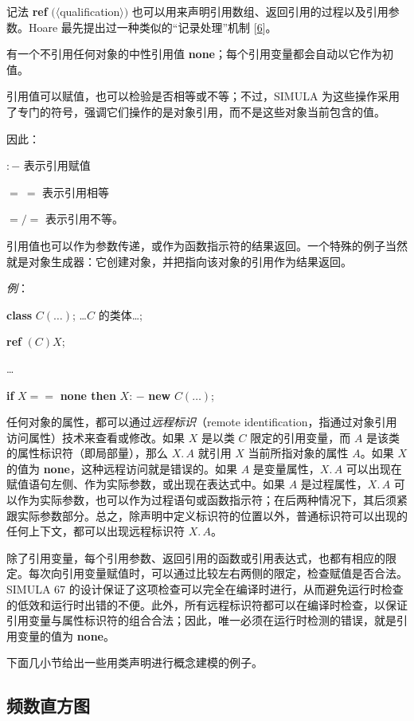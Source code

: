 \documentclass[twoside,11pt,fontset=none]{ctexbook}
\begin{document}
\noindent
记法 \textbf{ref} $(\langle$qualification$\rangle)$ 也可以用来声明引用数组、返回引用的过程以及引用参数。Hoare 最先提出过一种类似的“记录处理”机制 [\hyperref[ref:6]{6}]。

有一个不引用任何对象的中性引用值 \textbf{none}；每个引用变量都会自动以它作为初值。

引用值可以赋值，也可以检验是否相等或不等；不过，SIMULA 为这些操作采用了专门的符号，强调它们操作的是对象引用，而不是这些对象当前包含的值。

\noindent
因此：

\quad $:-$\tabto*{5.6em} 表示引用赋值

\quad $=\ =$\tabto*{5.6em} 表示引用相等

\quad $=/=$\tabto*{5.6em} 表示引用不等。

\noindent
引用值也可以作为参数传递，或作为函数指示符的结果返回。一个特殊的例子当然就是对象生成器：它创建对象，并把指向该对象的引用作为结果返回。

\noindent
\textit{例}：

\quad \textbf{class} $C(\dots)$; \dots $C$ 的类体\dots;

\quad \textbf{ref} $(C)X$;

\qquad \dots

\qquad \textbf{if} $X ==$ \textbf{none then} $X$: $-$ \textbf{new} $C(\dots)$;

任何对象的属性，都可以通过\textit{远程标识}（remote identification，指通过对象引用访问属性）技术来查看或修改。如果 $X$ 是以类 $C$ 限定的引用变量，而 $A$ 是该类的属性标识符（即局部量），那么 $X.\,A$ 就引用 $X$ 当前所指对象的属性 $A$。如果 $X$ 的值为 \textbf{none}，这种远程访问就是错误的。如果 $A$ 是变量属性，$X.\,A$ 可以出现在赋值语句左侧、作为实际参数，或出现在表达式中。如果 $A$ 是过程属性，$X.\,A$ 可以作为实际参数，也可以作为过程语句或函数指示符；在后两种情况下，其后须紧跟实际参数部分。总之，除声明中定义标识符的位置以外，普通标识符可以出现的任何上下文，都可以出现远程标识符 $X.\,A$。

除了引用变量，每个引用参数、返回引用的函数或引用表达式，也都有相应的限定。每次向引用变量赋值时，可以通过比较左右两侧的限定，检查赋值是否合法。SIMULA 67 的设计保证了这项检查可以完全在编译时进行，从而避免运行时检查的低效和运行时出错的不便。此外，所有远程标识符都可以在编译时检查，以保证引用变量与属性标识符的组合合法；因此，唯一必须在运行时检测的错误，就是引用变量的值为 \textbf{none}。

下面几小节给出一些用类声明进行概念建模的例子。


\subsection{频数直方图}
\label{sec:frequency-histogram}
\end{document}
